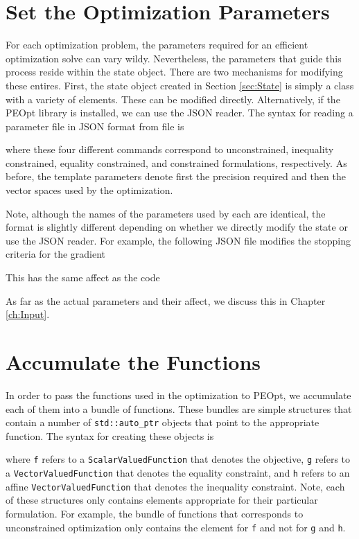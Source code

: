 \documentclass{report}
\begin{document}
\section{Set the Optimization Parameters}

        For each optimization problem, the parameters required for an efficient optimization solve can vary wildy.  Nevertheless, the parameters that guide this process reside within the state object.  There are two mechanisms for modifying these entires.  First, the state object created in Section \ref{sec:State} is simply a class with a variety of elements.  These can be modified directly.  Alternatively, if the PEOpt library is installed, we can use the JSON reader.  The syntax for reading a parameter file in JSON format from file is

where these four different commands correspond to unconstrained, inequality constrained, equality constrained, and constrained formulations, respectively.  As before, the template parameters denote first the precision required and then the vector spaces used by the optimization.

        Note, although the names of the parameters used by each are identical, the format is slightly different depending on whether we directly modify the state or use the JSON reader.  For example, the following JSON file modifies the stopping criteria for the gradient

This has the same affect as the code


        As far as the actual parameters and their affect, we discuss this in Chapter \ref{ch:Input}.

\section{Accumulate the Functions}

        In order to pass the functions used in the optimization to PEOpt, we accumulate each of them into a bundle of functions.  These bundles are simple structures that contain a number of \texttt{std::auto\_ptr} objects that point to the appropriate function.  The syntax for creating these objects is

where \texttt{f} refers to a \texttt{ScalarValuedFunction} that denotes the objective, \texttt{g} refers to a \texttt{VectorValuedFunction} that denotes the equality constraint, and \texttt{h} refers to an affine \texttt{VectorValuedFunction} that denotes the inequality constraint.  Note, each of these structures only contains elements appropriate for their particular formulation.  For example, the bundle of functions that corresponds to unconstrained optimization only contains the element for \texttt{f} and not for \texttt{g} and \texttt{h}.
\end{document}
